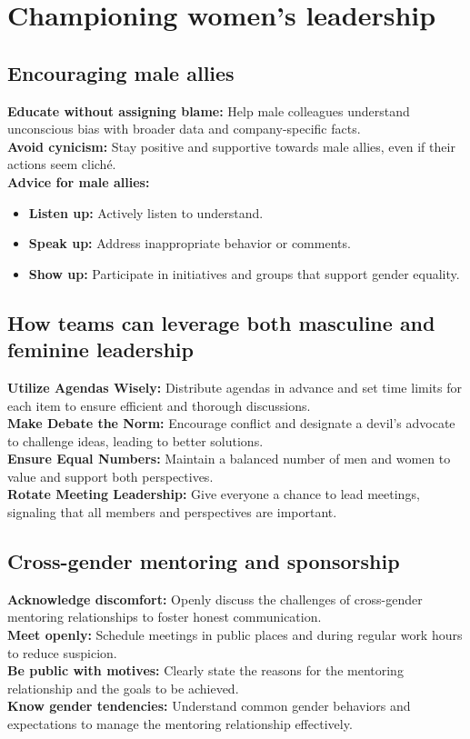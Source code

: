 \documentclass[12pt]{article}
\begin{document}

\section{Championing women's leadership}
\subsection{Encouraging male allies}
\textbf{Educate without assigning blame:}  Help male colleagues understand unconscious bias with broader data and company-specific facts.\\
\textbf{Avoid cynicism:}  Stay positive and supportive towards male allies, even if their actions seem cliché.\\
\textbf{Advice for male allies:}
    \begin{itemize}
        \item \textbf{Listen up:} Actively listen to understand.
        \item \textbf{Speak up:} Address inappropriate behavior or comments.
        \item \textbf{Show up:} Participate in initiatives and groups that support gender equality.
    \end{itemize}

\subsection{How teams can leverage both masculine and feminine leadership}
\textbf{Utilize Agendas Wisely:}  Distribute agendas in advance and set time limits for each item to ensure efficient and thorough discussions.\\
\textbf{Make Debate the Norm:}  Encourage conflict and designate a devil's advocate to challenge ideas, leading to better solutions.\\
\textbf{Ensure Equal Numbers:}  Maintain a balanced number of men and women to value and support both perspectives.\\
\textbf{Rotate Meeting Leadership:}  Give everyone a chance to lead meetings, signaling that all members and perspectives are important.

\subsection{Cross-gender mentoring and sponsorship}
\textbf{Acknowledge discomfort:}  Openly discuss the challenges of cross-gender mentoring relationships to foster honest communication.\\
\textbf{Meet openly:}  Schedule meetings in public places and during regular work hours to reduce suspicion.\\
\textbf{Be public with motives:}  Clearly state the reasons for the mentoring relationship and the goals to be achieved.\\
\textbf{Know gender tendencies:}  Understand common gender behaviors and expectations to manage the mentoring relationship effectively.
\end{document}
